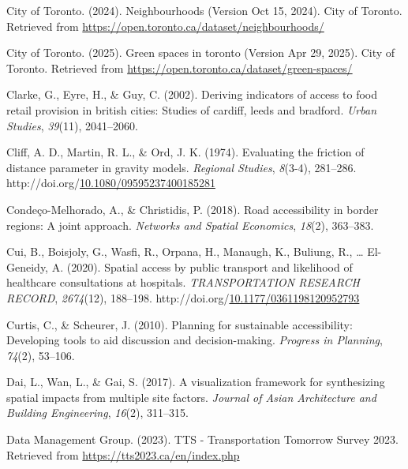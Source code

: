 \documentclass[
11pt, %
oneside, %
english, %
singlespacing, %
]{macthesis} %
\newlength{\cslhangindent}
\newenvironment{CSLReferences}[2] %
{\begin{list}{}{%
	\setlength{\itemindent}{0pt}
	\setlength{\leftmargin}{0pt}
	\setlength{\parsep}{0pt}
	\ifodd #1
	\setlength{\leftmargin}{\cslhangindent}
	\setlength{\itemindent}{-1\cslhangindent}
	\fi
	\setlength{\itemsep}{#2\baselineskip}}}
{\end{list}}
\begin{document}
\begin{CSLReferences}{1}{0}
City of Toronto. (2024). Neighbourhoods (Version Oct 15, 2024). City of Toronto. Retrieved from \url{https://open.toronto.ca/dataset/neighbourhoods/}

City of Toronto. (2025). Green spaces in toronto (Version Apr 29, 2025). City of Toronto. Retrieved from \url{https://open.toronto.ca/dataset/green-spaces/}

Clarke, G., Eyre, H., \& Guy, C. (2002). Deriving indicators of access to food retail provision in british cities: Studies of cardiff, leeds and bradford. \emph{Urban Studies}, \emph{39}(11), 2041--2060.

Cliff, A. D., Martin, R. L., \& Ord, J. K. (1974). Evaluating the friction of distance parameter in gravity models. \emph{Regional Studies}, \emph{8}(3-4), 281--286. http://doi.org/\href{https://doi.org/10.1080/09595237400185281}{10.1080/09595237400185281}

Condeço-Melhorado, A., \& Christidis, P. (2018). Road accessibility in border regions: A joint approach. \emph{Networks and Spatial Economics}, \emph{18}(2), 363--383.

Cui, B., Boisjoly, G., Wasfi, R., Orpana, H., Manaugh, K., Buliung, R., \ldots{} El-Geneidy, A. (2020). Spatial access by public transport and likelihood of healthcare consultations at hospitals. \emph{{TRANSPORTATION} {RESEARCH} {RECORD}}, \emph{2674}(12), 188--198. http://doi.org/\href{https://doi.org/10.1177/0361198120952793}{10.1177/0361198120952793}

Curtis, C., \& Scheurer, J. (2010). Planning for sustainable accessibility: Developing tools to aid discussion and decision-making. \emph{Progress in Planning}, \emph{74}(2), 53--106.

Dai, L., Wan, L., \& Gai, S. (2017). A visualization framework for synthesizing spatial impacts from multiple site factors. \emph{Journal of Asian Architecture and Building Engineering}, \emph{16}(2), 311--315.

Data Management Group. (2023). {TTS} - {Transportation} {Tomorrow} {Survey} 2023. Retrieved from \url{https://tts2023.ca/en/index.php}


\end{CSLReferences}
\end{document}
